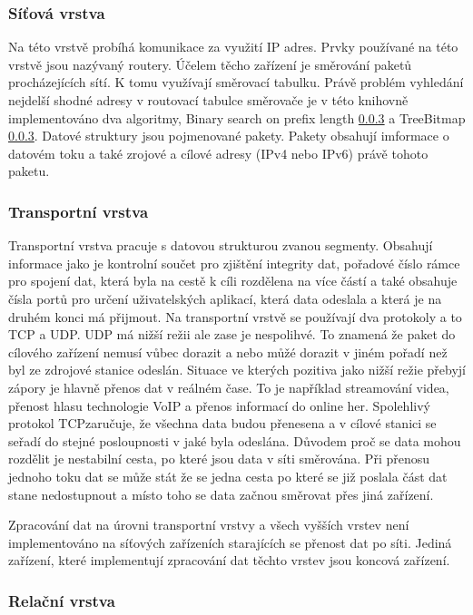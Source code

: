 \subsubsection{Síťová vrstva}\label{layers:network}
Na této vrstvě probíhá komunikace za využití IP adres. Prvky používané na této vrstvě jsou nazývaný routery.
Účelem těcho zařízení je směrování paketů procházejících sítí. K tomu využívají směrovací tabulku.
Právě problém vyhledání nejdelší shodné adresy v routovací tabulce směrovače je v této knihovně implementováno
dva algoritmy, Binary search on prefix length \ref{} a TreeBitmap \ref{}.
Datové struktury jsou pojmenované pakety. Pakety obsahují imformace o datovém toku a také zrojové a cílové adresy (IPv4 nebo IPv6) právě tohoto paketu.

\subsubsection{Transportní vrstva}
Transportní vrstva pracuje s datovou strukturou zvanou segmenty.
Obsahují informace jako je kontrolní součet pro zjištění integrity dat,
pořadové číslo rámce pro spojení dat, která byla na cestě k cíli rozdělena na více částí a také obsahuje čísla portů
pro určení uživatelských aplikací, která data odeslala a která je na druhém konci má přijmout.
Na transportní vrstvě se používají dva protokoly a to TCP a UDP. UDP má nižší režii ale zase je nespolihvé.
To znamená že paket do cílového zařízení nemusí vůbec dorazit a nebo můžé dorazit v jiném pořadí než byl ze
zdrojové stanice odeslán. Situace ve kterých pozitiva jako nižší režie přebyjí zápory je hlavně přenos dat v
reálném čase. To je například streamování videa, přenost hlasu technologie VoIP a přenos informací do online her.
Spolehlivý protokol TCPzaručuje, že všechna data budou přenesena a v cílové stanici se seřadí do
stejné posloupnosti v jaké byla odeslána. Důvodem proč se data mohou rozdělit je nestabilní cesta,
po které jsou data v síti směrována. Při přenosu jednoho toku dat se může stát že se jedna cesta po které se
již poslala část dat stane nedostupnout a místo toho se data začnou směrovat přes jiná zařízení.

Zpracování dat na úrovni transportní vrstvy a všech vyšších vrstev není implementováno na síťových
zařízeních starajících se přenost dat po síti. Jediná zařízení, které implementují zpracování
dat těchto vrstev jsou koncová zařízení.

\subsubsection{Relační vrstva}


